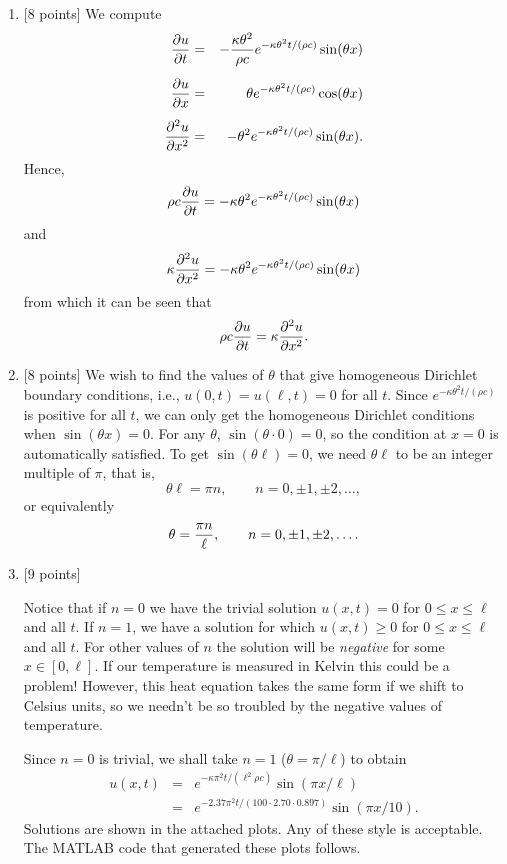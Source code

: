 \begin{solution}

\begin{enumerate}
\item {[8 points]} We compute
  \begin{eqnarray*}
     {{\partial}u\over {\partial}t} &=& -\frac{\kappa \theta^2}{\rho c} e^{-\kappa \theta^2 t/(\rho c)} \sin(\theta x) \\[0.5em]
     {{\partial}u\over {\partial}x} &=& \theta e^{-\kappa \theta^2 t/(\rho c)} \cos(\theta x) \\[0.5em]
     {{\partial}^2 u\over {\partial}x^2} &=& -\theta^2 e^{-\kappa \theta^2 t/(\rho c)} \sin(\theta x).
  \end{eqnarray*}
Hence,
 \[  \rho c {{\partial} u \over {\partial} t} = -\kappa \theta^2 e^{-\kappa \theta^2 t/(\rho c)} \sin(\theta x)\]
and
 \[  \kappa {{\partial}^2 u\over {\partial}x^2} = -\kappa \theta^2 e^{-\kappa \theta^2 t/(\rho c)} \sin(\theta x)\]
from which it can be seen that
 \[  \rho c {{\partial} u \over {\partial} t} = \kappa {{\partial}^2 u\over {\partial}x^2}.\]

\item {[8 points]} We wish to find the values of $\theta$ that give homogeneous Dirichlet boundary conditions,
      i.e., $u(0,t) = u(\ell,t)=0$ for all $t$.
      Since $e^{-\kappa \theta^2 t/(\rho c)}$ is positive for all $t$, we can only get
      the homogeneous Dirichlet conditions when $\sin(\theta x)=0$.
      For any $\theta$, $\sin(\theta\cdot 0) = 0$, so the condition at $x=0$ is automatically
      satisfied.  To get $\sin(\theta \ell) = 0$, we need $\theta \ell$ 
      to be an integer multiple of $\pi$, that is,
           \[ \theta \ell = \pi n, \qquad n = 0, \pm 1, \pm 2, \ldots,\]
      or equivalently
           \[ \theta  = {\pi n\over \ell}, \qquad n = 0, \pm 1, \pm 2, \ldots.\]

\item {[9 points]}

      Notice that if $n=0$ we have the trivial solution $u(x,t) =0 $ for $0\le x\le\ell$ and all $t$.
       If $n=1$, we have a solution for which $u(x,t) \ge 0$ for $0\le x\le\ell$ and all $t$.
       For other values of $n$ the solution will be \emph{negative} for some $x\in[0,\ell]$.
       If our temperature is measured in Kelvin this could be a problem!
       However, this heat equation takes the same form if we shift to Celsius units,
       so we needn't be so troubled by the negative values of temperature.

Since $n=0$ is trivial, we shall take $n=1$ ($\theta = \pi/\ell$) to obtain       
                  \begin{eqnarray*}
                        u(x,t) &=& e^{-\kappa \pi^2 t/(\ell^2 \rho c)} \sin(\pi x/\ell)  \\[0.5em]
                               &=& e^{-2.37 \pi^2 t/(100\cdot 2.70\cdot 0.897)} \sin(\pi x/10).
                  \end{eqnarray*}
Solutions are shown in the attached plots.  Any of these style is acceptable. 
      The MATLAB code that generated these plots follows. 



\end{enumerate}
\end{solution}
